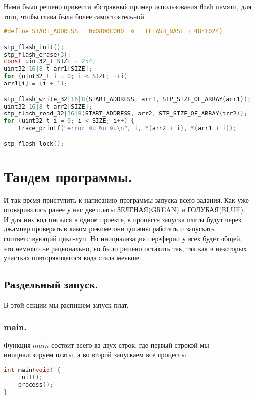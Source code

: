 \documentclass{bmstu}
\begin{document}
	Нами было решено привести абстракный пример использования flash памяти, для того, чтобы глава была более самостоятельной.
	
	\begingroup
	\fontsize{12pt}{12pt}\selectfont
	\begin{lstlisting}[language=C]
#define START_ADDRESS 	0x0800C000 	%	(FLASH_BASE + 48*1024)

stp_flash_init();
stp_flash_erase(3);
const uint32_t SIZE = 254;
uint32|16|8_t arr1[SIZE];
for (uint32_t i = 0; i < SIZE; ++i)
arr1[i] = (i + 1);

stp_flash_write_32|16|8(START_ADDRESS, arr1, STP_SIZE_OF_ARRAY(arr1));
uint32|16|8_t arr2[SIZE];
stp_flash_read_32|16|8(START_ADDRESS, arr2, STP_SIZE_OF_ARRAY(arr2));
for (uint32_t i = 0; i < SIZE; i++) {
	trace_printf("error %u %u %u\n", i, *(arr2 + i), *(arr1 + i));

stp_flash_lock();
	\end{lstlisting}
	\endgroup
	\chapter{Тандем программы.}
	
	И так время приступить к написанию программы запуска всего задания. Как уже оговаривалось ранее у нас две платы \underline{ЗЕЛЕНАЯ(GREAN)} и \underline{ГОЛУБАЯ(BLUE)}.
	И для них код писался в одном проекте, в процессе запуска платы будут через джампер проверять в каком режиме они должны работать и запускать соответствующий цикл-луп.
	Но инициализация переферии у всех будет общей, это немного не рационально, но было решено оставить так, так как в некоторых участках повторяющегося кода стала меньше.
	
	\section{Раздельный запуск.}
	
	В этой секции мы распишем запуск плат.
	
	\subsection{main.}
	
	Функция $main$ состоит всего из двух строк, где первый строкой мы инициализируем платы, а во второй запускаем все процессы.
	
	\begingroup
	\fontsize{12pt}{12pt}\selectfont
	\begin{lstlisting}[language=C]
int main(void) {
	init();
	process();
}
	\end{lstlisting}
	\endgroup
	
\end{document}
